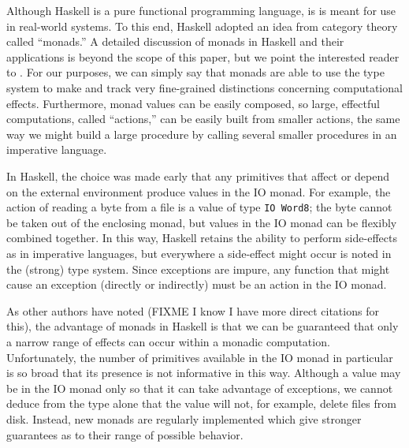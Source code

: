 \documentclass[11pt]{article}
\begin{document}
Although Haskell is a pure functional programming language, is is meant for use in real-world systems.
To this end, Haskell adopted an idea from category theory called ``monads.''
A detailed discussion of monads in Haskell and their applications is beyond the scope of this paper, but we point the interested reader to \cite{awkwardSquad}.
For our purposes, we can simply say that monads are able to use the type system to make and track very fine-grained distinctions concerning computational effects.
Furthermore, monad values can be easily composed, so large, effectful computations, called ``actions,'' can be easily built from smaller actions, the same way we might build a large procedure by calling several smaller procedures in an imperative language.

In Haskell, the choice was made early that any primitives that affect or depend on the external environment produce values in the IO monad.
For example, the action of reading a byte from a file is a value of type \texttt{IO Word8}; the byte cannot be taken out of the enclosing monad, but values in the IO monad can be flexibly combined together.
In this way, Haskell retains the ability to perform side-effects as in imperative languages, but everywhere a side-effect might occur is noted in the (strong) type system.
Since exceptions are impure, any function that might cause an exception (directly or indirectly) must be an action in the IO monad.

As other authors have noted \cite{ReflectionWithoutRemorse}(FIXME I know I have more direct citations for this), the advantage of monads in Haskell is that we can be guaranteed that only a narrow range of effects can occur within a monadic computation.
Unfortunately, the number of primitives available in the IO monad in particular is so broad that its presence is not informative in this way.
Although a value may be in the IO monad only so that it can take advantage of exceptions, we cannot deduce from the type alone that the value will not, for example, delete files from disk.
Instead, new monads are regularly implemented which give stronger guarantees as to their range of possible behavior.
\end{document}
